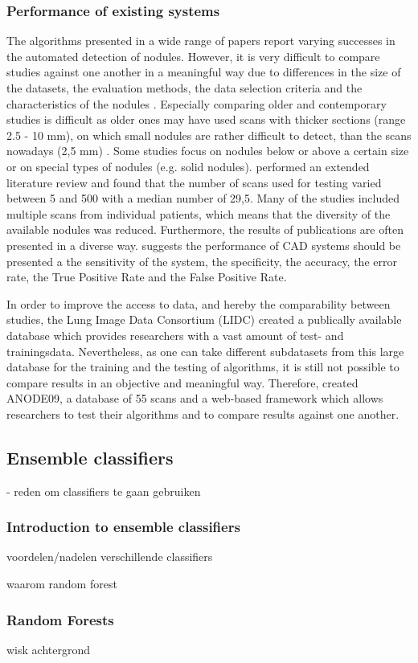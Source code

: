 \subsubsection{Performance of existing systems}
 The algorithms presented in a wide range of papers report varying
 successes in the automated detection of nodules. However, it is very difficult
 to compare studies against one another in a meaningful way due to differences
 in the size of the datasets, the evaluation methods, the data selection
 criteria and the characteristics of the nodules \cite{lee2010}. Especially comparing older and contemporary studies is
 difficult as older ones may have used scans with thicker sections (range 2.5 -
 10 mm), on which small nodules are rather difficult to detect, than the scans
 nowadays (2,5 mm) \cite{lee2010, ginneken} \cite{mur}. Some studies
 focus on nodules below or above a certain size or on special types of nodules
 (e.g. solid nodules). \cite{mur} performed an extended
 literature review and found that the number of scans used for testing varied between 5 and 500 with a
 median number of 29,5. Many of the studies included multiple scans from
 individual patients, which means that the diversity of the available nodules
 was reduced. Furthermore, the results of publications are often presented in a
 diverse way. \cite{results} suggests the performance of CAD systems should be
 presented a the sensitivity of the system, the specificity, the accuracy, the
 error rate, the True Positive Rate and the False Positive Rate.
 
 In order to improve the access to data, and hereby the comparability between
 studies, the Lung Image Data Consortium (LIDC) created a publically available
 database which provides researchers with a vast amount of test- and
 trainingsdata. Nevertheless, as one can take different subdatasets from this
 large database for the training and the testing of algorithms, it is still not
 possible to compare results in an objective and meaningful way. Therefore,
 \cite{ginneken} created ANODE09, a database of 55 scans and a web-based
 framework which allows researchers to test their algorithms and to
 compare results against one another.
 
\subsection{Ensemble classifiers}
- reden om classifiers te gaan gebruiken

\subsubsection{Introduction to ensemble classifiers}
voordelen/nadelen verschillende classifiers

waarom random forest

\subsubsection{Random Forests}
wisk achtergrond







